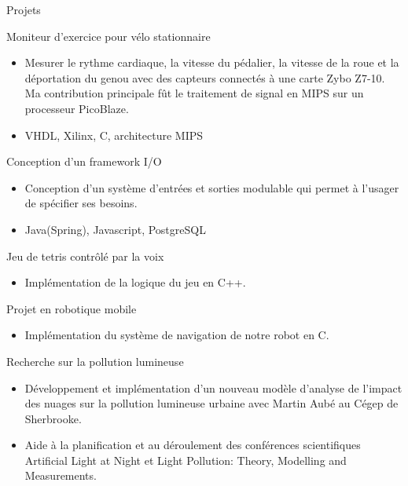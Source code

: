 \documentclass{article}
\newlength{\tabin}
\newlength{\secsep}
\newcommand{\lineunder}{\vspace*{-8pt} \\ \hspace*{-6pt} \hrulefill \\ \vspace*{-15pt}}
\newenvironment{tabbedsection}[1]{
  \begin{list}{}{
      \setlength{\itemsep}{0pt}
      \setlength{\labelsep}{0pt}
      \setlength{\labelwidth}{0pt}
      \setlength{\leftmargin}{\tabin}
      \setlength{\rightmargin}{\tabin}
      \setlength{\listparindent}{0pt}
      \setlength{\parsep}{0pt}
      \setlength{\parskip}{0pt}
      \setlength{\partopsep}{0pt}
      \setlength{\topsep}{#1}
    }
  \item[]
}{\end{list}}
\newenvironment{resume_section}[1]{
  \filbreak
  \vspace{2\secsep}
  \textsc{\large#1}
  \lineunder
  \begin{tabbedsection}{\secsep}
}{\end{tabbedsection}}
\newenvironment{resume_subsection}[2][]{
  \textbf{#2} \hfill {\footnotesize #1} \hspace{2em}
  \begin{tabbedsection}{0.5\secsep}
}{\end{tabbedsection}}
\newenvironment{subitems}{
  \renewcommand{\labelitemi}{-}
  \begin{itemize}
      \setlength{\labelsep}{1em}
}{\end{itemize}}
\begin{document}
\begin{resume_section}{Projets}
  \begin{resume_subsection}[Hiver 2019]{Moniteur d'exercice pour vélo stationnaire}
  \begin{subitems}
    \item Mesurer le rythme cardiaque, la vitesse du pédalier, la vitesse de la roue et la déportation du genou avec des capteurs connectés à une carte Zybo Z7-10. Ma contribution principale fût le traitement de signal en MIPS sur un processeur PicoBlaze.
    \item VHDL, Xilinx, C, architecture MIPS
    \end{subitems}
  \end{resume_subsection}

  \begin{resume_subsection}[Été 2018]{Conception d'un framework I/O}
  \begin{subitems}
    \item Conception d’un système d’entrées et sorties modulable qui permet à l’usager de spécifier ses besoins.
    \item Java(Spring), Javascript, PostgreSQL
    \end{subitems}
  \end{resume_subsection}

  \begin{resume_subsection}[Hiver 2018]{Jeu de tetris contrôlé par la voix}
    \begin{subitems}
        \item Implémentation de la logique du jeu en C++.
    \end{subitems}
  \end{resume_subsection}
  
  \begin{resume_subsection}[Automne 2017]{Projet en robotique mobile}
    \begin{subitems}
    \item Implémentation du système de navigation de notre robot en C.
    \end{subitems}
  \end{resume_subsection}
  
    \begin{resume_subsection}[2014-2015]{Recherche sur la pollution lumineuse}
        \begin{subitems}
        \item Développement et implémentation d'un nouveau modèle d'analyse de l'impact des nuages sur la pollution lumineuse urbaine avec Martin Aubé au Cégep de Sherbrooke.
        \item Aide à la planification et au déroulement des conférences scientifiques Artificial Light at Night et Light Pollution: Theory, Modelling and Measurements.
        \end{subitems}
    \end{resume_subsection}
\end{resume_section}
\end{document}
